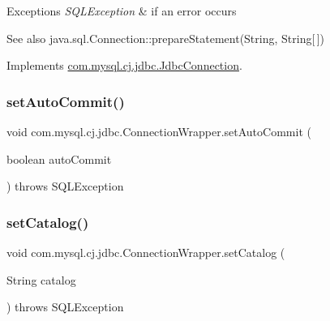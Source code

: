 \begin{DoxyExceptions}{Exceptions}
{\em S\+Q\+L\+Exception} & if an error occurs\\
\hline
\end{DoxyExceptions}
\begin{DoxySeeAlso}{See also}
java.\+sql.\+Connection\+::prepare\+Statement(\+String, String\mbox{[}$\,$\mbox{]}) 
\end{DoxySeeAlso}


Implements \mbox{\hyperlink{interfacecom_1_1mysql_1_1cj_1_1jdbc_1_1_jdbc_connection_aa15ffc32d47d1950257c4720802694bf}{com.\+mysql.\+cj.\+jdbc.\+Jdbc\+Connection}}.

\mbox{\label{classcom_1_1mysql_1_1cj_1_1jdbc_1_1_connection_wrapper_aabb56a4ee8754e61709454d48379bbe4}} 
\subsubsection{\texorpdfstring{set\+Auto\+Commit()}{setAutoCommit()}}
{\footnotesize\ttfamily void com.\+mysql.\+cj.\+jdbc.\+Connection\+Wrapper.\+set\+Auto\+Commit (\begin{DoxyParamCaption}\item[{boolean}]{auto\+Commit }\end{DoxyParamCaption}) throws S\+Q\+L\+Exception}

\mbox{\label{classcom_1_1mysql_1_1cj_1_1jdbc_1_1_connection_wrapper_a86b87e7280723520f0a14160f927d5ef}} 
\subsubsection{\texorpdfstring{set\+Catalog()}{setCatalog()}}
{\footnotesize\ttfamily void com.\+mysql.\+cj.\+jdbc.\+Connection\+Wrapper.\+set\+Catalog (\begin{DoxyParamCaption}\item[{String}]{catalog }\end{DoxyParamCaption}) throws S\+Q\+L\+Exception}

